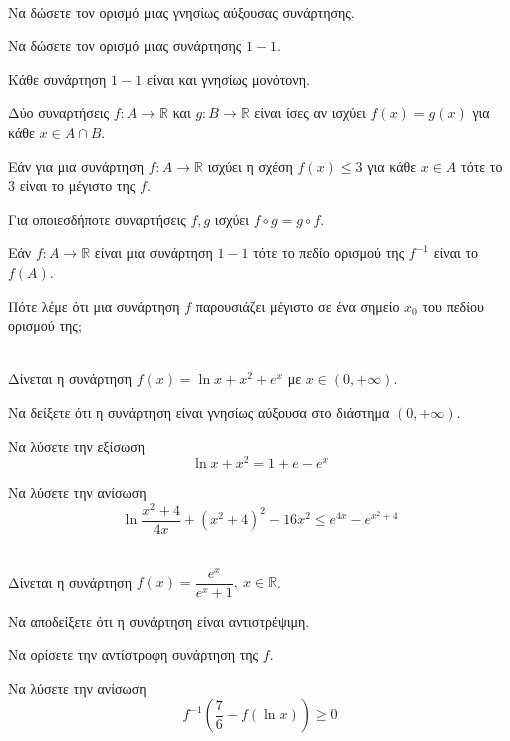 \documentclass[twoside,nofonts,ektypwsh]{frontisthrio-diag}
\begin{document}
\begin{thema}
\item \mbox{}\\\vspace{-5mm}
\begin{erwthma}
\item Να δώσετε τον ορισμό μιας γνησίως αύξουσας συνάρτησης.
\item Να δώσετε τον ορισμό μιας συνάρτησης $ 1-1 $.
\item \swstolathospan
\begin{alist}
\item Κάθε συνάρτηση $ 1-1 $ είναι και γνησίως μονότονη.
\item Δύο συναρτήσεις $ f:A\to\mathbb{R} $ και $ g:B\to\mathbb{R} $ είναι ίσες αν ισχύει $ f(x)=g(x) $ για κάθε $ x\in A\cap B $.
\item Εάν για μια συνάρτηση $ f:A\to\mathbb{R} $ ισχύει η σχέση $ f(x)\leq 3 $ για κάθε $ x\in A $ τότε το $ 3 $ είναι το μέγιστο της $ f $.
\item Για οποιεσδήποτε συναρτήσεις $ f,g $ ισχύει $ f\circ g=g\circ f $.
\item Εάν $ f:A\to\mathbb{R} $ είναι μια συνάρτηση $ 1-1 $ τότε το πεδίο ορισμού της $ f^{-1} $ είναι το $ f(A) $.
\end{alist}
\item Πότε λέμε ότι μια συνάρτηση $ f $ παρουσιάζει μέγιστο σε ένα σημείο $ x_0 $ του πεδίου ορισμού της;\\
\end{erwthma}
\item \mbox{}\\
Δίνεται η συνάρτηση $ f(x)=\ln{x}+x^2+e^x $ με $ x\in(0,+\infty) $.
\begin{erwthma}
\item Να δείξετε ότι η συνάρτηση είναι γνησίως αύξουσα στο διάστημα $ (0,+\infty) $.
\item Να λύσετε την εξίσωση \[ \ln{x}+x^2=1+e-e^x \]
\item Να λύσετε την ανίσωση  \[ \ln{\dfrac{x^2+4}{4x}}+\left( x^2+4\right)^2-16x^2\leq e^{4x}-e^{x^2+4} \] 
\end{erwthma}
\item \mbox{}\\
Δίνεται η συνάρτηση $ f(x)=\dfrac{e^x}{e^x+1},\ x\in\mathbb{R} $.
\begin{erwthma}
\item Να αποδείξετε ότι η συνάρτηση είναι αντιστρέψιμη.
\item Να ορίσετε την αντίστροφη συνάρτηση της $ f $.
\item Να λύσετε την ανίσωση
\[ f^{-1}\left(\frac{7}{6}-f(\ln{x}) \right)\geq0  \]
\end{erwthma}
\end{thema}
\kaliepityxia
\end{document}
